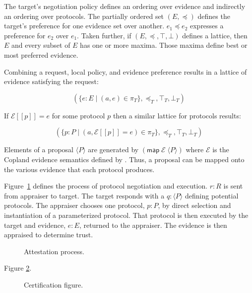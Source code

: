 \documentclass[sigconf,authordraft]{acmart}
\begin{document}
The target's negotiation policy defines an ordering over evidence and
indirectly an ordering over protocols.  The partially ordered set
$(E,\preceq)$ defines the target's preference for one evidence set
over another. $e_1\preceq e_2$ expresses a preference for $e_2$ over
$e_1$.  Taken further, if $(E,\preceq,\top,\bot)$ defines a lattice,
then $E$ and every subset of $E$ has one or more maxima.  Those maxima
define best or most preferred evidence.

Combining a request, local policy, and evidence preference results in
a lattice of evidence satisfying the request:

\[(\{e:E\mid (a,e)\in\pi_T\},\preceq_T,\top_T,\bot_T)\]

If $\mathcal{E}[\![p]\!]=e$ for some protocol $p$ then a similar
lattice for protocols results:

\[(\{p:P\mid (a,\mathcal{E}[\![p]\!]=e)\in\pi_T\},\preceq_T,\top_T,\bot_T)\]


Elements of a proposal $\langle P\rangle$ are generated by
$(\mathsf{map}\; \mathcal{E}\; \langle P\rangle)$ where $\mathcal{E}$
is the Copland evidence semantics defined by \citet{Ramsdell:2019aa}.
Thus, a proposal can be mapped onto the various evidence that each
protocol produces.

Figure~\ref{fig:sequence-fig} defines the process of protocol
negotiation and execution.  $r:R$ is sent from appraiser to
target.  The target responds with a $q:\langle P\rangle$  defining potential
protocols.  The appraiser chooses one protocol, $p:P$, by direct selection and
instantiation of a parameterized protocol.  That protocol is then
executed by the target and evidence, $e:E$, returned to the appraiser.  The
evidence is then appraised to determine trust.

\begin{figure}[hbtp]
  \centering
  
  \caption[Attestation process]{Attestation process.}
  \label{fig:sequence-fig}
\end{figure}

Figure \ref{fig:certification-fig}.

\begin{figure}[hbtp]
  \centering
  
  \caption[Attestation process]{Certification figure.}
  \label{fig:certification-fig}
\end{figure}
\end{document}
